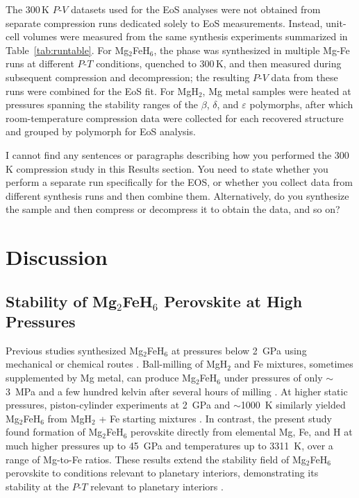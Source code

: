 \documentclass[draft,jgrga,12pt]{agujournal2019}
\begin{document}
The 300\,K $P$-$V$ datasets used for the EoS analyses were not obtained from separate compression runs dedicated solely to EoS measurements. 
Instead, unit-cell volumes were measured from the same synthesis experiments summarized in Table~\ref{tab:runtable}. 
For Mg$_2$FeH$_6$, the phase was synthesized in multiple Mg-Fe runs at different $P$-$T$ conditions, quenched to 300\,K, and then measured during subsequent compression and decompression; the resulting $P$-$V$ data from these runs were combined for the EoS fit. 
For MgH$_2$, Mg metal samples were heated at pressures spanning the stability ranges of the $\beta$, $\delta$, and $\varepsilon$ polymorphs, after which room-temperature compression data were collected for each recovered structure and grouped by polymorph for EoS analysis.

\begin{cboxr}
I cannot find any sentences or paragraphs describing how you performed the 300 K compression study in this Results section.
You need to state whether you perform a separate run specifically for the EOS, or whether you collect data from different synthesis runs and then combine them. Alternatively, do you synthesize the sample and then compress or decompress it to obtain the data, and so on?
\end{cboxr}

\section{Discussion}

\subsection{Stability of Mg$_2$FeH$_6$ Perovskite at High Pressures}

Previous studies synthesized Mg$_2$FeH$_6$ at pressures below 2~{GPa} using mechanical or chemical routes \cite{george_bulk_2009,polanski_mg2feh6_2019, lang_insitu_2017,retuerto_highpressure_2010, retuerto_neutron_2015}.
Ball-milling of MgH$_2$ and Fe mixtures, sometimes supplemented by Mg metal, can produce Mg$_2$FeH$_6$ under pressures of only $\sim$3~{MPa} and a few hundred kelvin after several hours of milling \cite{george_bulk_2009,polanski_mg2feh6_2019, lang_insitu_2017}.
At higher static pressures, piston-cylinder experiments at 2~GPa and $\sim$1000~K similarly yielded Mg$_2$FeH$_6$ from MgH$_2$ + Fe starting mixtures \cite{retuerto_highpressure_2010, retuerto_neutron_2015}.
In contrast, the present study found formation of Mg$_2$FeH$_6$ perovskite directly from elemental Mg, Fe, and H at much higher pressures  up to 45~{GPa} and temperatures up to 3311~K, over a range of Mg-to-Fe ratios. 
These results extend the stability field of Mg$_2$FeH$_6$ perovskite to conditions relevant to planetary interiors, demonstrating its stability at the $P$-$T$ relevant to planetary interiors \cite{asselli_formation_2013,puszkiel_new_2018}. 
\end{document}
